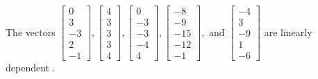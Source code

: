 \begin{exercise}
\begin{exerciseStatement}
  \end{exerciseStatement}
  \begin{exerciseAnswer}
   The vectors \(\left[\begin{array}{r}
0 \\
3 \\
-3 \\
2 \\
-1
\end{array}\right] , \left[\begin{array}{r}
4 \\
3 \\
3 \\
3 \\
4
\end{array}\right] , \left[\begin{array}{r}
0 \\
-3 \\
-3 \\
-4 \\
4
\end{array}\right] , \left[\begin{array}{r}
-8 \\
-9 \\
-15 \\
-12 \\
-1
\end{array}\right] , \text{ and } \left[\begin{array}{r}
-4 \\
3 \\
-9 \\
1 \\
-6
\end{array}\right]\) are 
  	 linearly dependent  .
  


  \end{exerciseAnswer}
\end{exercise}